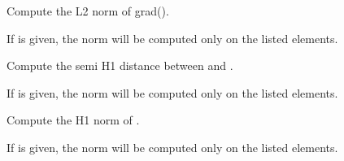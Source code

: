 \documentclass[a4paper,11pt,english]{sphinxmanual}
\begin{document}

\begin{fulllineitems}
\label{\detokenize{python/cmdref_Module compute:getfem.compute_H1_semi_norm}}
Compute the L2 norm of grad().

If  is given, the norm will be computed only on the listed
elements.

\end{fulllineitems}


\begin{fulllineitems}
\label{\detokenize{python/cmdref_Module compute:getfem.compute_H1_semi_dist}}
Compute the semi H1 distance between  and .

If  is given, the norm will be computed only on the listed
elements.

\end{fulllineitems}


\begin{fulllineitems}
\label{\detokenize{python/cmdref_Module compute:getfem.compute_H1_norm}}
Compute the H1 norm of .

If  is given, the norm will be computed only on the listed
elements.

\end{fulllineitems}
\end{document}
